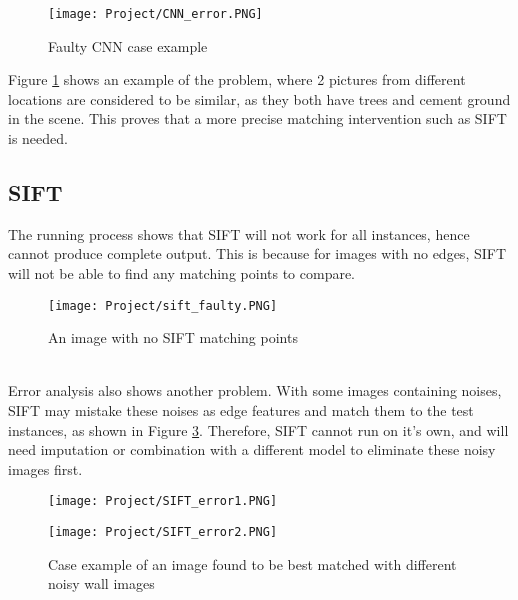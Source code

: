 \documentclass[11pt]{article}
\begin{document}
\begin{multicols}{2}
\begin{figure}[H]
    \centering
    \texttt{[image: Project/CNN\_error.PNG]}
    \caption{Faulty CNN case example}
    \label{fig:cnn}
\end{figure}

\noindent Figure \ref{fig:cnn} shows an example of the problem, where 2 pictures from different locations are considered to be similar, as they both have trees and cement ground in the scene. This proves that a more precise matching intervention such as SIFT is needed.

\subsection{SIFT}

\begin{minipage}{0.19\textwidth}
\noindent The running process shows that SIFT will not work for all instances, hence cannot produce complete output. This is because for images with no edges, SIFT will not be able to find any matching points to compare.
\end{minipage}\hfill
\begin{minipage}{0.24\textwidth}
\begin{figure}[H]
    \centering
    \texttt{[image: Project/sift\_faulty.PNG]}
    \caption{An image with no SIFT matching points}
    \label{fig:sift_case}
\end{figure}
\end{minipage}\\%

\noindent Error analysis also shows another problem. With some images containing noises, SIFT may mistake these noises as edge features and match them to the test instances, as shown in Figure \ref{fig:sift}. Therefore, SIFT cannot run on it's own, and will need imputation or combination with a different model to eliminate these noisy images first.

\begin{figure}[H]
    \centering
    \texttt{[image: Project/SIFT\_error1.PNG]}
\end{figure}
\vspace{-1cm}
\begin{figure}[H]
    \centering
    \texttt{[image: Project/SIFT\_error2.PNG]}
    \caption{Case example of an image found to be best matched with different noisy wall images}
    \label{fig:sift}
\end{figure}


\end{multicols}
\end{document}
